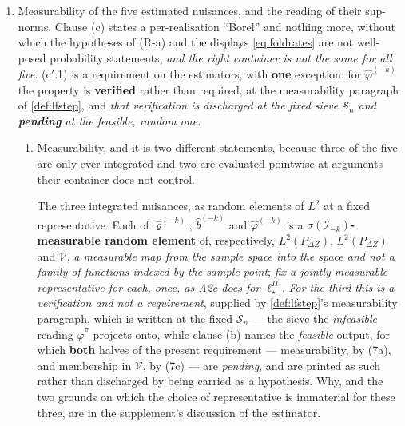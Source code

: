 \begin{definition}
\begin{enumerate}
sup-norm convention \eqref{eq:supnormconv} is \textbf{not} unconditional. What the three properties
buy is in the supplement's discussion of the estimator.
\item[(c$'$)] Measurability of the five estimated nuisances, and the reading of their sup-norms.
Clause \textup{(c)} states a per-realisation ``Borel'' and nothing more, without which the hypotheses
of (R-a) and the displays \eqref{eq:foldrates} are not well-posed probability statements; \emph{and the
right container is not the same for all five}. \textup{(c$'$.1)} is a requirement on the estimators,
with \textbf{one} exception: for $\hat\varphi^{(-k)}$ the property is \textbf{verified} rather than
required, at the measurability paragraph of \cref{def:lfstep}, and \emph{that verification is
discharged at the fixed sieve $\mathcal S_n$ and \textbf{pending} at the feasible, random one}.
\begin{enumerate}
\item[(c$'$.1)] Measurability, and it is two different statements, because three of the five are
only ever integrated and two are evaluated pointwise at arguments their container does not control.

The three integrated nuisances, as random elements of $L^{2}$ at a fixed representative. Each of
$\hat\varrho^{(-k)}$, $\hat b^{(-k)}$ and $\hat\varphi^{(-k)}$ is a
\textbf{$\sigma(\mathcal I_{-k})$-measurable random element} of, respectively, $L^{2}(P_{\Delta Z})$,
$L^{2}(P_{\Delta Z})$ and $\mathcal V$, \emph{a measurable map from the sample space into the space and
not a family of functions indexed by the sample point}; \emph{fix a jointly measurable representative
for each, once, as A2c does for $\ell^\Pi_\star$}. \emph{For the third this is a verification and not a
requirement}, supplied by \cref{def:lfstep}'s measurability paragraph, which is written at the fixed
$\mathcal S_n$ --- the sieve the \emph{infeasible} reading $\hat\varphi^{\pi}$ projects onto, while
clause \textup{(b)} names the \emph{feasible} output, for which \textbf{both} halves of the present
requirement --- measurability, by \textup{(7a)}, and membership in
$\mathcal V$, by \textup{(7c)} --- are \emph{pending}, and are printed as
such rather than discharged by being carried as a hypothesis. Why, and the two grounds on which the
choice of representative is immaterial for these three, are in the supplement's discussion of the
estimator.


\end{enumerate}
\end{enumerate}
\end{definition}
